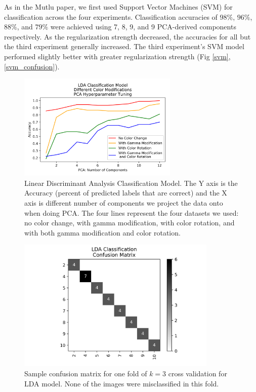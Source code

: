\documentclass[journal]{IEEEtran}
\begin{document}
As in the Mutlu paper, we first used Support Vector Machines (SVM) for classification across the four experiments. Classification accuracies of $98\%$, $96\%$, $88\%$, and $79\%$ were achieved using 7, 8, 9, and 9 PCA-derived components respectively. As the regularization strength decreased, the accuracies for all but the third experiment generally increased. The third experiment’s SVM model performed slightly better with greater regularization strength (Fig \ref{svm}, \ref{svm_confusion}).

\begin{figure}
\centering
\includegraphics[height=2in]{LDA/lda_classification.png}
\caption{Linear Discriminant Analysis Classification Model. The Y axis is the Accuracy (percent of predicted labels that are correct) and the X axis is different number of components we project the data onto when doing PCA. The four lines represent the four datasets we used: no color change, with gamma modification, with color rotation, and with both gamma modification and color rotation.}
\label{lda}
\end{figure}

\begin{figure}
\centering
\includegraphics[height=2.5in]{LDA/LDA_classification_cfm.png}
\caption{Sample confusion matrix for one fold of $k=3$ cross validation for LDA model. None of the images were misclassified in this fold.}
\label{lda_confusion}
\end{figure}
\end{document}
